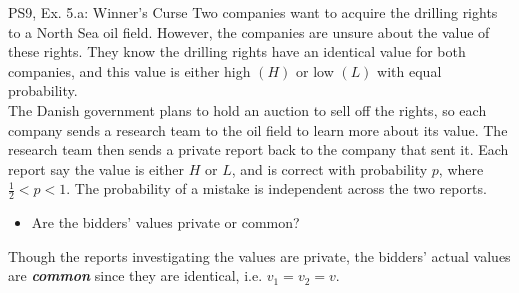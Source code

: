 \begin{frame}{PS9, Ex. 5.a: Winner's Curse}
    Two companies want to acquire the drilling rights to a North Sea oil field. However, the companies are unsure about the value of these rights. They know the drilling rights have an identical value for both companies, and this value is either high $(H)$ or low $(L)$ with equal probability.\\\medskip
    The Danish government plans to hold an auction to sell off the rights, so each company sends a research team to the oil field to learn more about its value. The research team then sends a private report back to the company that sent it. Each report say the value is either $H$ or $L$, and is correct with probability $p$, where $\frac{1}{2} < p < 1$. The probability of a mistake is independent across the two reports.
    \begin{itemize}
      \item[(a)] Are the bidders’ values private or common?
    \end{itemize}
    Though the reports investigating the values are private, the bidders' actual values are \textit{\textbf{common}} since they are identical, i.e. $v_1=v_2=v$.
    \vfill\null
\end{frame}


